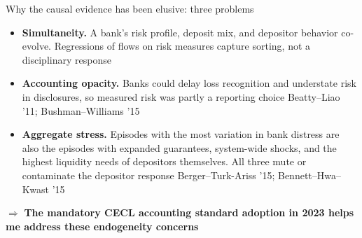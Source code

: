 \documentclass[aspectratio=169,10pt]{beamer}
\newcommand{\takeaway}[1]{%
  \vfill
  {\centering\colorbox{pblue!8}{\parbox{0.94\textwidth}{\centering
    \textcolor{pblue}{$\Rightarrow$ \textbf{#1}}}}\par}}
\newcommand{\gcite}[1]{{\scriptsize\textcolor{pgray}{#1}}}
\begin{document}
\begin{frame}{Why the causal evidence has been elusive: three problems}
  \begin{itemize}
    \item \textbf{Simultaneity.} A bank's risk profile, deposit mix, and
      depositor behavior co-evolve. Regressions of flows on risk measures
      capture sorting, not a disciplinary response
    \item \textbf{Accounting opacity.} Banks could delay loss recognition and
      understate risk in disclosures, so measured
      risk was partly a reporting choice
      \gcite{Beatty--Liao '11; Bushman--Williams '15}
    \item \textbf{Aggregate stress.} Episodes with the most variation in bank
      distress are also the episodes with expanded guarantees, system-wide
      shocks, and the highest liquidity needs of depositors themselves. All
      three mute or contaminate the depositor response
      \gcite{Berger--Turk-Ariss '15; Bennett--Hwa--Kwast '15}
  \end{itemize}
  \takeaway{The mandatory CECL accounting standard adoption in 2023 helps me address these
    endogeneity concerns}
\end{frame}
\end{document}
